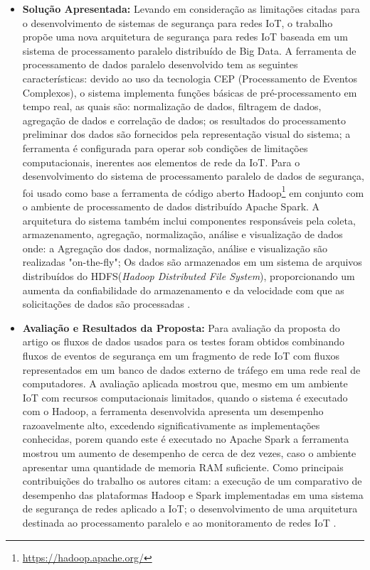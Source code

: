 \documentclass[tid,table]{texufpel} %
\begin{document}
\begin{itemize}
	\item \textbf{Solução Apresentada:} Levando em consideração as limitações citadas para o desenvolvimento de sistemas de segurança para redes IoT, o trabalho propõe uma nova arquitetura de segurança para redes IoT baseada em um sistema de processamento paralelo distribuído de Big Data. A ferramenta de processamento de dados paralelo desenvolvido tem as seguintes características: devido ao uso da tecnologia CEP (Processamento de Eventos Complexos), o sistema implementa funções básicas de pré-processamento em tempo real, as quais são: normalização de dados, filtragem de dados, agregação de dados e correlação de dados; os resultados do processamento preliminar dos dados são fornecidos pela representação visual do sistema; a ferramenta é configurada para operar sob condições de limitações computacionais, inerentes aos elementos de rede da IoT. Para o desenvolvimento do sistema de processamento paralelo de dados de segurança, foi usado como base a ferramenta de código aberto Hadoop\footnote{\url{https://hadoop.apache.org/}} em conjunto com o ambiente de processamento de dados distribuído Apache Spark. A arquitetura do sistema também inclui componentes responsáveis pela coleta, armazenamento, agregação, normalização, análise e visualização de dados onde: a Agregação dos dados, normalização, análise e visualização são realizadas "on-the-fly"; Os dados são armazenados em um sistema de arquivos distribuídos do HDFS(\textit{Hadoop Distributed File System}), proporcionando um aumenta da confiabilidade do armazenamento e da velocidade com que as solicitações de dados são processadas \cite{art8kotenko2017parallel}.
	

	\item \textbf{Avaliação e Resultados da Proposta:} Para avaliação da proposta do artigo os fluxos de dados usados para os testes foram obtidos combinando fluxos de eventos de segurança em um fragmento de rede IoT com fluxos representados em um banco de dados externo de tráfego em uma rede real de computadores. A avaliação aplicada mostrou que, mesmo em um ambiente IoT com recursos computacionais limitados, quando o sistema é executado com o Hadoop, a ferramenta desenvolvida apresenta um desempenho razoavelmente alto, excedendo significativamente as implementações conhecidas, porem quando este é executado no Apache Spark a ferramenta mostrou um aumento de desempenho de cerca de dez vezes, caso o ambiente apresentar uma quantidade de memoria RAM suficiente. Como principais contribuições do trabalho os autores citam: a execução de um comparativo de desempenho das plataformas Hadoop e Spark implementadas em uma sistema de segurança de redes aplicado a IoT; o desenvolvimento de uma arquitetura destinada ao processamento paralelo e ao monitoramento de redes IoT \cite{art8kotenko2017parallel}. 
	
	
	
	
\end{itemize}
\end{document}
